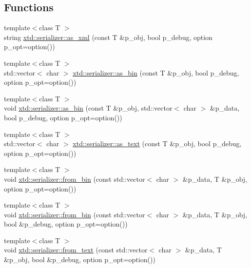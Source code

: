 \subsection*{Functions}
\begin{DoxyCompactItemize}
\item 
{\footnotesize template$<$class T $>$ }\\string \hyperlink{namespacextd_1_1serializer_aff0b24f230c8b5083104eccb94242a8c}{xtd\-::serializer\-::as\-\_\-xml} (const T \&p\-\_\-obj, bool p\-\_\-debug, option p\-\_\-opt=option())
\item 
{\footnotesize template$<$class T $>$ }\\std\-::vector$<$ char $>$ \hyperlink{namespacextd_1_1serializer_a0088e6d509f6652e58c7c0eea9102884}{xtd\-::serializer\-::as\-\_\-bin} (const T \&p\-\_\-obj, bool p\-\_\-debug, option p\-\_\-opt=option())
\item 
{\footnotesize template$<$class T $>$ }\\void \hyperlink{namespacextd_1_1serializer_a1c43eba643505bba5858d6d5431201fb}{xtd\-::serializer\-::as\-\_\-bin} (const T \&p\-\_\-obj, std\-::vector$<$ char $>$ \&p\-\_\-data, bool p\-\_\-debug, option p\-\_\-opt=option())
\item 
{\footnotesize template$<$class T $>$ }\\std\-::vector$<$ char $>$ \hyperlink{namespacextd_1_1serializer_a5ac463bb961b98f1b8b7c2655d2772db}{xtd\-::serializer\-::as\-\_\-text} (const T \&p\-\_\-obj, bool p\-\_\-debug, option p\-\_\-opt=option())
\item 
{\footnotesize template$<$class T $>$ }\\void \hyperlink{namespacextd_1_1serializer_a601beccda10ec2760c371d39045bec0e}{xtd\-::serializer\-::from\-\_\-bin} (const std\-::vector$<$ char $>$ \&p\-\_\-data, T \&p\-\_\-obj, option p\-\_\-opt=option())
\item 
{\footnotesize template$<$class T $>$ }\\void \hyperlink{namespacextd_1_1serializer_a76ec6ed068121fc7ff0f6514132c5683}{xtd\-::serializer\-::from\-\_\-bin} (const std\-::vector$<$ char $>$ \&p\-\_\-data, T \&p\-\_\-obj, bool \&p\-\_\-debug, option p\-\_\-opt=option())
\item 
{\footnotesize template$<$class T $>$ }\\void \hyperlink{namespacextd_1_1serializer_a27ea640a20bff130274562ddd8762c0a}{xtd\-::serializer\-::from\-\_\-text} (const std\-::vector$<$ char $>$ \&p\-\_\-data, T \&p\-\_\-obj, bool \&p\-\_\-debug, option p\-\_\-opt=option())
\end{DoxyCompactItemize}


